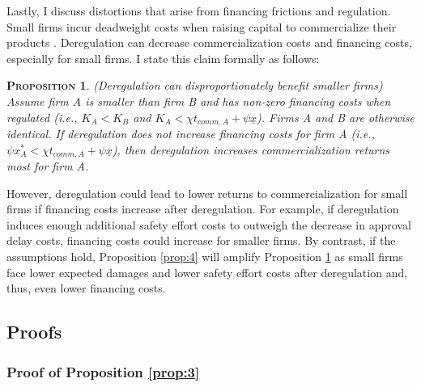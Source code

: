 \documentclass[letterpaper,12pt]{article}
\theoremstyle{definition}
\newtheorem{proposition}{\normalfont\scshape Proposition} %
\begin{document}
Lastly, I discuss distortions that arise from financing frictions and regulation. Small firms incur deadweight costs when raising capital to commercialize their products \citep{gaglani_2014,emergo_2019}. Deregulation can decrease commercialization costs and financing costs, especially for small firms. I state this claim formally as follows:
\begin{proposition}\label{prop:1} \textit{(Deregulation can disproportionately benefit smaller firms) Assume firm A is smaller than firm B and has non-zero financing costs when regulated (i.e., $K_A < K_B$ and $K_A < \chi t_{comm,A} +  \psi \underline{x}$). Firms A and B are otherwise identical. If deregulation does not increase financing costs for firm A (i.e., $\psi x^*_A < \chi t_{comm,A} +  \psi \underline{x}$), then deregulation increases commercialization returns most for firm A.
}
\end{proposition}

However, deregulation could lead to lower returns to commercialization for small firms if financing costs increase after deregulation. For example, if deregulation induces enough additional safety effort costs to outweigh the decrease in approval delay costs, financing costs could increase for smaller firms. By contrast, if the assumptions hold, Proposition \ref{prop:4} will amplify Proposition \ref{prop:1} as small firms face lower expected damages and lower safety effort costs after deregulation and, thus, even lower financing costs.

\subsection{Proofs}\label{sec:proofs}

\subsubsection*{Proof of Proposition \ref{prop:3}}
\end{document}
